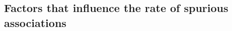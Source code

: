 \documentclass[12pt]{article}
\begin{document}




\subsection{Factors that influence the rate of spurious associations}
\end{document}
